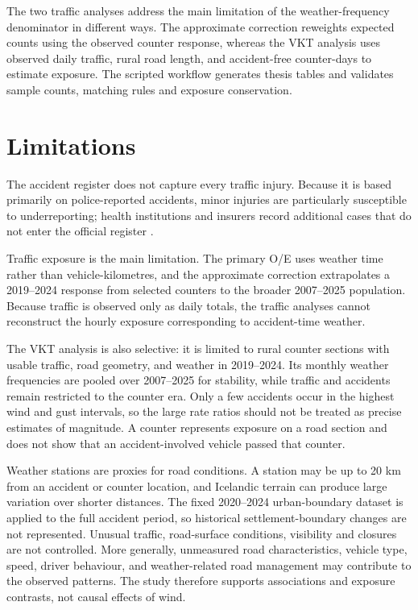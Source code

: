 The two traffic analyses address the main limitation of the weather-frequency
denominator in different ways. The approximate correction reweights expected
counts using the observed counter response, whereas the VKT
analysis uses observed daily traffic, rural road length, and accident-free
counter-days to estimate exposure. The scripted workflow generates thesis tables and validates sample counts, matching rules and exposure conservation.

\section{Limitations}

The accident register does not capture every traffic injury. Because it is based primarily on police-reported accidents, minor injuries are particularly susceptible to underreporting; health institutions and insurers record additional cases that do not enter the official register \citep{samgongustofaRegister}.

Traffic exposure is the main limitation. The primary O/E uses weather time rather
than vehicle-kilometres, and the approximate correction extrapolates a
2019--2024 response from selected counters to the broader 2007--2025 population.
Because traffic is observed only as daily totals, the traffic analyses cannot
reconstruct the hourly exposure corresponding to accident-time weather.

The VKT analysis is also selective: it is limited to rural counter sections with
usable traffic, road geometry, and weather in 2019--2024. Its monthly weather
frequencies are pooled over 2007--2025 for stability, while traffic and accidents
remain restricted to the counter era. Only a few accidents occur in the highest wind and gust intervals, so the large rate ratios should not be treated as precise estimates of magnitude. A counter represents exposure on a road section and does not
show that an accident-involved vehicle passed that counter.

Weather stations are proxies for road conditions. A station may be up to 20 km
from an accident or counter location, and Icelandic terrain can produce large
variation over shorter distances. The fixed 2020--2024 urban-boundary dataset
is applied to the full accident period, so historical settlement-boundary
changes are not represented. Unusual traffic, road-surface conditions, visibility and closures are not controlled. More generally, unmeasured road characteristics, vehicle
type, speed, driver behaviour, and weather-related road management may
contribute to the observed patterns. The study therefore supports associations
and exposure contrasts, not causal effects of wind.

